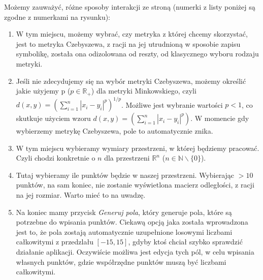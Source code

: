 \documentclass[a4paper,twoside,11pt]{mwrep}
\newcommand{\R}{{\mathbb R}}
\newcommand{\N}{{\mathbb N}}
\begin{document}
Możemy zauważyć, różne sposoby interakcji ze stroną (numerki z listy poniżej są zgodne z numerkami na rysunku):
\begin{enumerate}
    \item W tym miejscu, możemy wybrać, czy metryka z której chcemy skorzystać, jest to metryka Czebyszewa, z racji na jej utrudnioną w sposobie zapisu symbolikę, została ona odizolowana od reszty, od klasycznego wyboru rodzaju metryki.
    \item Jeśli nie zdecydujemy się na wybór metryki Czebyszewa, możemy określić jakie użyjemy p ($p\in\R_+$) dla metryki Minkowskiego, czyli $d(x,y)=\left(\sum_{i=1}^n |x_i-y_i|^p\right)^{1/p}$. Możliwe jest wybranie wartości $p < 1$, co skutkuje użyciem wzoru $d(x,y)=\left(\sum_{i=1}^n |x_i-y_i|^p\right)$. W momencie gdy wybierzemy metrykę Czebyszewa, pole to automatycznie znika.
    \item W tym miejscu wybieramy wymiary przestrzeni, w której będziemy pracować. Czyli chodzi konkretnie o $n$ dla przestrzeni $\R^n$ ($n\in\N\backslash \{0\} $).
    \item Tutaj wybieramy ile punktów będzie w naszej przestrzeni. Wybierając $>10$ punktów, na sam koniec, nie zostanie wyświetlona macierz odległości, z racji na jej rozmiar. Warto mieć to na uwadzę.
    \item Na koniec mamy przycisk \textit{Generuj pola}, który generuje pola, które są potrzebne do wpisania punktów. Ciekawą opcją jaka została wprowadzona jest to, że pola zostają automatycznie uzupełnione losowymi liczbami całkowitymi z przedzlału $[-15,15]$, gdyby ktoś chciał szybko sprawdzić działanie aplikacji. Oczywiście możliwa jest edycja tych pól, w celu wpisania własnych punktów, gdzie współrzędne punktów muszą być liczbami całkowitymi.
\end{enumerate}
\end{document}
